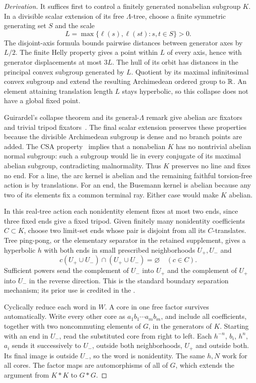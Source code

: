 \begin{proof}[Derivation]
It suffices first to control a finitely generated nonabelian subgroup
$K$. In a divisible scalar extension of its free $\Lambda$-tree,
choose a finite symmetric generating set $S$ and the scale
\[
 L=\max\{\ell(s),\ell(st):s,t\in S\}>0.
\]
The disjoint-axis formula bounds pairwise distances between generator
axes by $L/2$. The finite Helly property gives a point within $L$
of every axis, hence with generator displacements at most $3L$.
The hull of its orbit has distances in the principal convex subgroup
generated by $L$. Quotient by its maximal infinitesimal convex subgroup
and extend the resulting Archimedean ordered group to $\mathbb R$.
An element attaining translation length $L$ stays hyperbolic, so this
collapse does not have a global fixed point.

Guirardel's collapse theorem and its general-$\Lambda$ remark give
abelian arc fixators and trivial tripod fixators~\cite[Fact 5.1]{guirardel}.
The final scalar extension preserves these properties because the
divisible Archimedean subgroup is dense and no branch points are added.
The CSA property~\cite[Lemma 2.5]{guirardel} implies that a nonabelian
$K$ has no nontrivial abelian normal subgroup: such a subgroup would
lie in every conjugate of its maximal abelian subgroup, contradicting
malnormality. Thus $K$ preserves no line and fixes no end. For a line,
the arc kernel is abelian and the remaining faithful torsion-free action
is by translations. For an end, the Busemann kernel is abelian because
any two of its elements fix a common terminal ray. Either case would
make $K$ abelian.

In this real-tree action each nonidentity element fixes at most two
ends, since three fixed ends give a fixed tripod. Given finitely many
nonidentity coefficients $C\subset K$, choose two limit-set ends
whose pair is disjoint from all its $C$-translates. Tree ping-pong,
or the elementary separator in the retained supplement, gives a
hyperbolic $h$ with both ends in small prescribed neighborhoods
$U_+,U_-$ and
\[
 c(U_+\cup U_-)\cap(U_+\cup U_-)=\varnothing\quad(c\in C).
\]
Sufficient powers send the complement of $U_-$ into $U_+$ and the
complement of $U_+$ into $U_-$ in the reverse direction. This is the
standard boundary separation mechanism; its prior use is credited
in the .

Cyclically reduce each word in $W$. A core in one free factor survives
automatically. Write every other core as $a_1b_1\cdots a_mb_m$,
and include all coefficients, together with two noncommuting elements
of $G$, in the generators of $K$. Starting with an end in $U_-$,
read the substituted core from right to left. Each $h^{-n}$, $b_i$,
$h^n$, $a_i$ sends it successively to $U_-$, outside both neighborhoods,
$U_+$ and outside both. Its final image is outside $U_-$, so the
word is nonidentity. The same $h,N$ work for all cores. The factor maps
are automorphisms of all of $G$, which extends the argument from
$K*K$ to $G*G$.
\end{proof}

